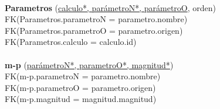 \documentclass[a4paper,10pt]{article}
\newcommand\tab[1][1cm]{\hspace*{#1}}
\begin{document}
\paragraph{}
{\bf Parametros} (\underline{calculo*, parámetroN*, parámetroO}, orden)\\
\tab FK(Parametros.parametroN = parametro.nombre)\\
\tab FK(Parametros.parametroO = parametro.origen)\\
\tab FK(Parametros.calculo = calculo.id)

\paragraph{}
{\bf m-p} (\underline{parámetroN*, parametroO*, magnitud*})\\
\tab FK(m-p.parametroN = parametro.nombre)\\
\tab FK(m-p.parametroO = parametro.origen)\\
\tab FK(m-p.magnitud = magnitud.magnitud)

\pagebreak

%   




\end{document}
